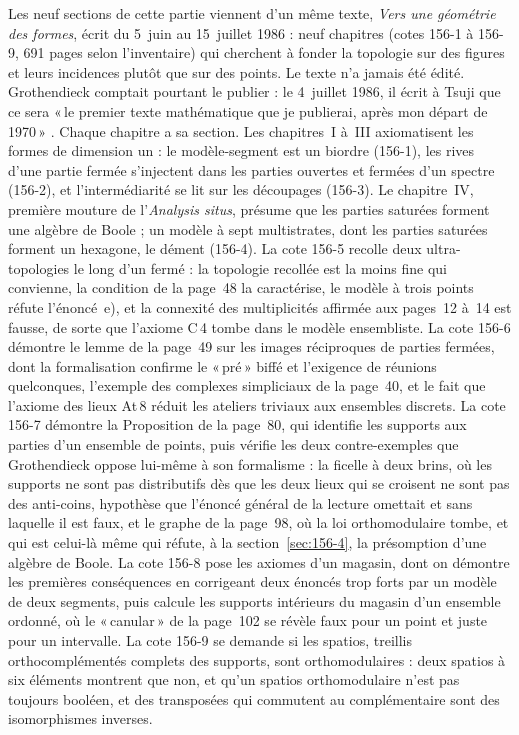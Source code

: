 \documentclass[11pt]{article}
\newcommand{\q}[1]{«\,#1\,»}
\theoremstyle{plain}
\theoremstyle{definition}
\theoremstyle{plain}
\theoremstyle{definition}
\theoremstyle{remark}
\renewcommand{\_}{\bkunderscore\allowbreak}
\begin{document}
\noindent Les neuf sections de cette partie viennent d'un même texte, \emph{Vers une géométrie des formes}, écrit du 5~juin au 15~juillet 1986 : neuf chapitres (cotes 156-1 à 156-9, 691 pages selon l'inventaire) qui cherchent à fonder la topologie sur des figures et leurs incidences plutôt que sur des points. Le texte n'a jamais été édité. Grothendieck comptait pourtant le publier : le 4~juillet 1986, il écrit à Tsuji que ce sera \q{le premier texte mathématique que je publierai, après mon départ de 1970} \cite{cruzmorales2021}. Chaque chapitre a sa section. Les chapitres~I à~III axiomatisent les formes de dimension un : le modèle-segment est un biordre (156-1), les rives d'une partie fermée s'injectent dans les parties ouvertes et fermées d'un spectre (156-2), et l'intermédiarité se lit sur les découpages (156-3). Le chapitre~IV, première mouture de l'\emph{Analysis situs}, présume que les parties saturées forment une algèbre de Boole ; un modèle à sept multistrates, dont les parties saturées forment un hexagone, le dément (156-4). La cote 156-5 recolle deux ultra-topologies le long d'un fermé : la topologie recollée est la moins fine qui convienne, la condition de la page~48 la caractérise, le modèle à trois points réfute l'énoncé~e), et la connexité des multiplicités affirmée aux pages~12 à~14 est fausse, de sorte que l'axiome C\,4 tombe dans le modèle ensembliste. La cote 156-6 démontre le lemme de la page~49 sur les images réciproques de parties fermées, dont la formalisation confirme le \q{pré} biffé et l'exigence de réunions quelconques, l'exemple des complexes simpliciaux de la page~40, et le fait que l'axiome des lieux At\,8 réduit les ateliers triviaux aux ensembles discrets. La cote 156-7 démontre la Proposition de la page~80, qui identifie les supports aux parties d'un ensemble de points, puis vérifie les deux contre-exemples que Grothendieck oppose lui-même à son formalisme : la ficelle à deux brins, où les supports ne sont pas distributifs dès que les deux lieux qui se croisent ne sont pas des anti-coins, hypothèse que l'énoncé général de la lecture omettait et sans laquelle il est faux, et le graphe de la page~98, où la loi orthomodulaire tombe, et qui est celui-là même qui réfute, à la section~\ref{sec:156-4}, la présomption d'une algèbre de Boole. La cote 156-8 pose les axiomes d'un magasin, dont on démontre les premières conséquences en corrigeant deux énoncés trop forts par un modèle de deux segments, puis calcule les supports intérieurs du magasin d'un ensemble ordonné, où le \q{canular} de la page~102 se révèle faux pour un point et juste pour un intervalle. La cote 156-9 se demande si les spatios, treillis orthocomplémentés complets des supports, sont orthomodulaires : deux spatios à six éléments montrent que non, et qu'un spatios orthomodulaire n'est pas toujours booléen, et des transposées qui commutent au complémentaire sont des isomorphismes inverses.









\end{document}
